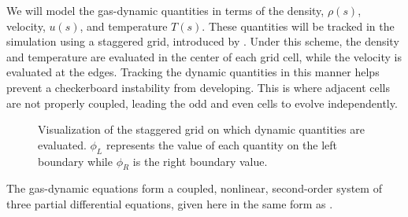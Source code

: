 \documentclass[iop]{emulateapj}
\begin{document}
				We will model the gas-dynamic quantities in terms of the density, $\rho(s)$, velocity, $u(s)$, and temperature $T(s)$. These quantities will be tracked in the simulation using a staggered grid, introduced by \cite{1965PhFl....8.2182H}. Under this scheme, the density and temperature are evaluated in the center of each grid cell, while the velocity is evaluated at the edges. Tracking the dynamic quantities in this manner helps prevent a checkerboard instability from developing. This is where adjacent cells are not properly coupled, leading the odd and even cells to evolve independently. 
				\begin{figure}[H]
					\centering
					\caption{Visualization of the staggered grid on which dynamic quantities are evaluated. $\phi_L$ represents the value of each quantity on the left boundary while $\phi_R$ is the right boundary value. }
				\end{figure}

			
				The gas-dynamic equations form a coupled, nonlinear, second-order system of three partial differential equations, given here in the same form as \cite{2014ApJ...795...10L}.
				
\end{document}
